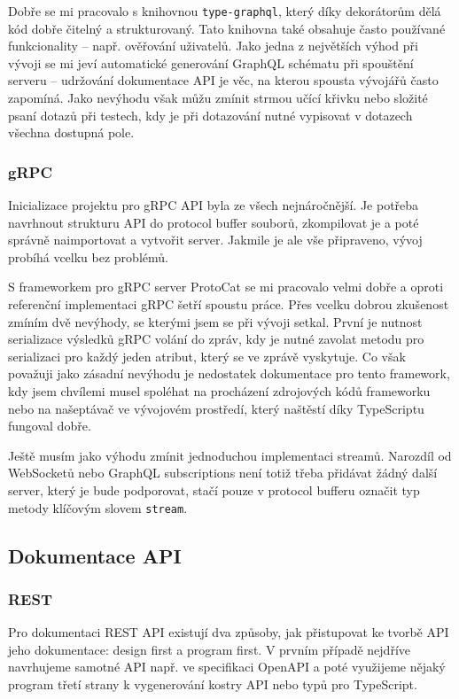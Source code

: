 \documentclass[thesis=M,czech]{FITthesis}[2019/12/23]
\begin{document}
Dobře se mi pracovalo s knihovnou \texttt{type-graphql}\cite{typegraphql_doc}, který díky dekorátorům dělá kód dobře čitelný a strukturovaný. Tato knihovna také obsahuje často používané funkcionality -- např. ověřování uživatelů. Jako jedna z největších výhod při vývoji se mi jeví automatické generování GraphQL schématu při spouštění serveru -- udržování dokumentace API je věc, na kterou spousta vývojářů často zapomíná. Jako nevýhodu však můžu zmínit strmou učící křivku nebo složité psaní dotazů při testech, kdy je při dotazování nutné vypisovat v dotazech všechna dostupná pole.

\subsubsection*{gRPC}
Inicializace projektu pro gRPC API byla ze všech nejnáročnější. Je potřeba navrhnout strukturu API do protocol buffer souborů, zkompilovat je a poté správně naimportovat a vytvořit server. Jakmile je ale vše připraveno, vývoj probíhá vcelku bez problémů.

S frameworkem pro gRPC server ProtoCat se mi pracovalo velmi dobře a oproti referenční implementaci gRPC šetří spoustu práce. Přes vcelku dobrou zkušenost zmíním dvě nevýhody, se kterými jsem se při vývoji setkal. První je nutnost serializace výsledků gRPC volání do zpráv, kdy je nutné zavolat metodu pro serializaci pro každý jeden atribut, který se ve zprávě vyskytuje. Co však považuji jako zásadní nevýhodu je nedostatek dokumentace pro tento framework, kdy jsem chvílemi musel spoléhat na procházení zdrojových kódů frameworku nebo na našeptávač ve vývojovém prostředí, který naštěstí díky TypeScriptu fungoval dobře.

Ještě musím jako výhodu zmínit jednoduchou implementaci streamů. Narozdíl od  WebSocketů nebo GraphQL subscriptions není totiž třeba přidávat žádný další server, který je bude podporovat, stačí pouze v protocol bufferu označit typ metody klíčovým slovem \texttt{stream}.


\subsection*{Dokumentace API}
\subsubsection*{REST}
Pro dokumentaci REST API existují dva způsoby, jak přistupovat ke tvorbě API jeho dokumentace: design first a program first.%
V prvním případě nejdříve navrhujeme samotné API např. ve specifikaci OpenAPI a poté využijeme nějaký program třetí strany k vygenerování kostry API nebo typů pro TypeScript.
\end{document}
